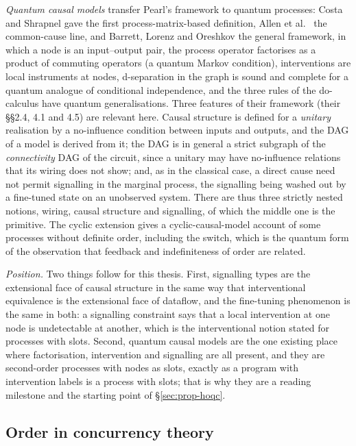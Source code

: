 \emph{Quantum causal models} transfer Pearl's framework to quantum processes: Costa and Shrapnel \cite{costa2016quantumcausalmodelling} gave the first process-matrix-based definition, Allen et al.\ \cite{allen2017quantumcommoncauses} the common-cause line, and Barrett, Lorenz and Oreshkov \cite{barrett2019quantumcausalmodels} the general framework, in which a node is an input--output pair, the process operator factorises as a product of commuting operators (a quantum Markov condition), interventions are local instruments at nodes, d-separation in the graph is sound and complete for a quantum analogue of conditional independence, and the three rules of the do-calculus have quantum generalisations. Three features of their framework (their \S\S2.4, 4.1 and 4.5) are relevant here. Causal structure is defined for a \emph{unitary} realisation by a no-influence condition between inputs and outputs, and the DAG of a model is derived from it; the DAG is in general a strict subgraph of the \emph{connectivity} DAG of the circuit, since a unitary may have no-influence relations that its wiring does not show; and, as in the classical case, a direct cause need not permit signalling in the marginal process, the signalling being washed out by a fine-tuned state on an unobserved system. There are thus three strictly nested notions, wiring, causal structure and signalling, of which the middle one is the primitive. The cyclic extension \cite{barrett2021cyclic} gives a cyclic-causal-model account of some processes without definite order, including the switch, which is the quantum form of the observation that feedback and indefiniteness of order are related.

\emph{Position.} Two things follow for this thesis. First, signalling types are the extensional face of causal structure in the same way that interventional equivalence is the extensional face of dataflow, and the fine-tuning phenomenon is the same in both: a signalling constraint says that a local intervention at one node is undetectable at another, which is the interventional notion stated for processes with slots. Second, quantum causal models are the one existing place where factorisation, intervention and signalling are all present, and they are second-order processes with nodes as slots, exactly as a program with intervention labels is a process with slots; that is why they are a reading milestone and the starting point of \S\ref{sec:prop-hoqc}.

\subsection{Order in concurrency theory}\label{sec:concurrency}

